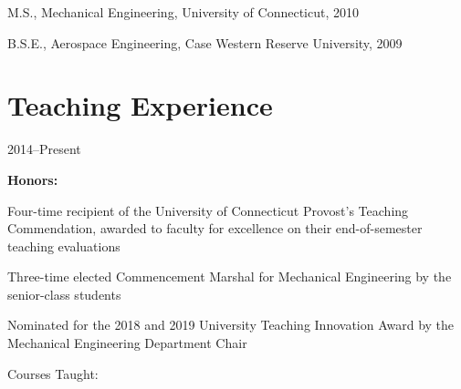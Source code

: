 M.S., Mechanical Engineering, University of Connecticut, 2010

B.S.E., Aerospace Engineering, Case Western Reserve University, 2009

\section{{\sectionfont{} Teaching Experience}}

 \hfill 2014--Present

\textbf{Honors:}

\begin{innerlist}
    \item Four-time recipient of the University of Connecticut Provost's Teaching Commendation, awarded to faculty for excellence on their end-of-semester teaching evaluations
    \item Three-time elected Commencement Marshal for Mechanical Engineering by the senior-class students
    \item Nominated for the 2018 and 2019 University Teaching Innovation Award by the Mechanical Engineering Department Chair
\end{innerlist}
\vspace{0.5\baselineskip}
Courses Taught:


